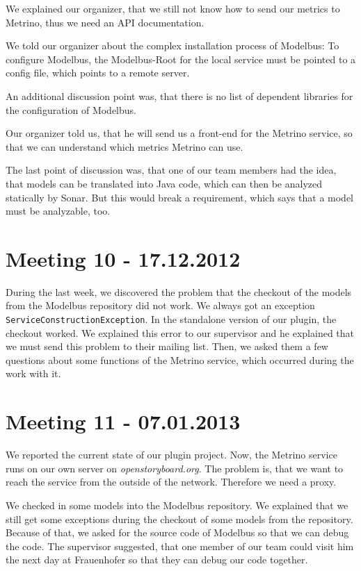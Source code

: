 We explained our organizer, that we still not know how to send our metrics to Metrino, thus we need an API documentation.

We told our organizer about the complex installation process of Modelbus: To configure Modelbus, the Modelbus-Root for the local service must be pointed to a config file, which points to a remote server.

An additional discussion point was, that there is no list of dependent libraries for the configuration of Modelbus.

Our organizer told us, that he will send us a front-end for the Metrino service, so that we can understand which metrics Metrino can use.

The last point of discussion was, that one of our team members had the idea, that models can be translated into Java code, which can then be analyzed statically by Sonar. But this would break a requirement, which says that a model must be analyzable, too.

\section{Meeting 10 - 17.12.2012}
During the last week, we discovered the problem that the checkout of the models from the Modelbus repository did not work. We always got an exception \\\texttt{ServiceConstructionException}. In the standalone version of our plugin, the checkout worked. We explained this error to our supervisor and he explained that we must send this problem to their mailing list. Then, we asked them a few questions about some functions of the Metrino service, which occurred during the work with it.

\section{Meeting 11 - 07.01.2013}
We reported the current state of our plugin project. Now, the Metrino service runs on our own server on \emph{openstoryboard.org}. The problem is, that we want to reach the service from the outside of the network. Therefore we need a proxy.

We checked in some models into the Modelbus repository. We explained that we still get some exceptions during the checkout of some models from the repository. Because of that, we asked for the source code of Modelbus so that we can debug the code. The supervisor suggested, that one member of our team could visit him the next day at Frauenhofer so that they can debug our code together.

